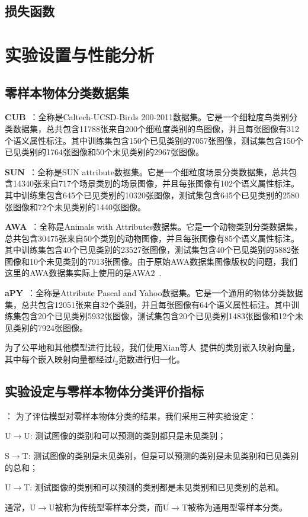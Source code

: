 \subsection{损失函数}


\section{实验设置与性能分析}
\subsection{零样本物体分类数据集}
\textbf{CUB}~\cite{wah2011caltech}：全称是Caltech-UCSD-Birds 200-2011数据集。它是一个细粒度鸟类别分类数据集，总共包含11788张来自200个细粒度类别的鸟图像，并且每张图像有312个语义属性标注。其中训练集包含150个已见类别的7057张图像，测试集包含150个已见类别的1764张图像和50个未见类别的2967张图像。

\textbf{SUN}~\cite{patterson2012sun}：全称是SUN attribute数据集。它是一个细粒度场景分类数据集，总共包含14340张来自717个场景类别的场景图像，并且每张图像有102个语义属性标注。其中训练集包含645个已见类别的10320张图像，测试集包含645个已见类别的2580张图像和72个未见类别的1440张图像。

\textbf{AWA}~\cite{lampert2009learning}：全称是Animals with Attributes数据集。它是一个动物类别分类数据集，总共包含30475张来自50个类别的动物图像，并且每张图像有85个语义属性标注。其中训练集包含40个已见类别的23527张图像，测试集包含40个已见类别的5882张图像和10个未见类别的7913张图像。由于原始AWA数据集图像版权的问题，我们这里的AWA数据集实际上使用的是AWA2~\cite{xian2017zero}.

\textbf{aPY}~\cite{farhadi2009describing}：全称是Attribute Pascal and Yahoo数据集。它是一个通用的物体分类数据集，总共包含12051张来自32个类别，并且每张图像有64个语义属性标注。其中训练集包含20个已见类别5932张图像，测试集包含20个已见类别1483张图像和12个未见类别的7924张图像。

为了公平地和其他模型进行比较，我们使用Xian等人~\cite{xian2017zero}提供的类别嵌入映射向量，其中每个嵌入映射向量都经过$l_2$范数进行归一化。


\subsection{实验设定与零样本物体分类评价指标}
：
为了评估模型对零样本物体分类的结果，我们采用三种实验设定：
\begin{asparaenum}
\item U$\to$U: 测试图像的类别和可以预测的类别都只是未见类别；

\item S$\to$T: 测试图像的类别是未见类别，但是可以预测的类别是未见类别和已见类别的总和；

\item U$\to$T: 测试图像的类别和可以预测的类别都是未见类别和已见类别的总和。
\end{asparaenum}
通常，U$\to$U被称为传统型零样本分类，而U$\to$T被称为通用型零样本分类。

